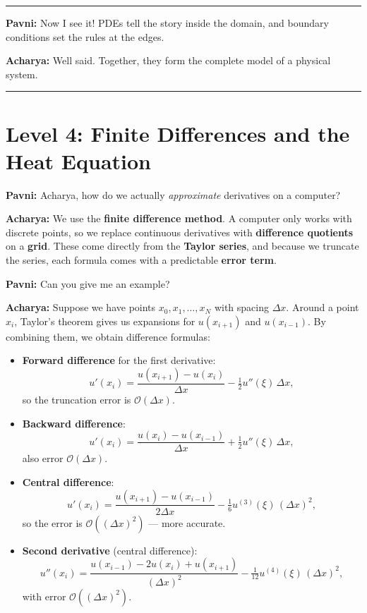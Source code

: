\documentclass[
  letterpaper,
]{book}
\begin{document}
\begin{center}\rule{0.5\linewidth}{0.5pt}\end{center}

\textbf{Pavni:} Now I see it! PDEs tell the story inside the domain, and
boundary conditions set the rules at the edges.

\textbf{Acharya:} Well said. Together, they form the complete model of a
physical system.

\begin{center}\rule{0.5\linewidth}{0.5pt}\end{center}


\chapter{Level 4: Finite Differences and the Heat
Equation}\label{level-4-finite-differences-and-the-heat-equation}

\textbf{Pavni:} Acharya, how do we actually \emph{approximate}
derivatives on a computer?

\textbf{Acharya:} We use the \textbf{finite difference method}. A
computer only works with discrete points, so we replace continuous
derivatives with \textbf{difference quotients} on a \textbf{grid}. These
come directly from the \textbf{Taylor series}, and because we truncate
the series, each formula comes with a predictable \textbf{error term}.

\textbf{Pavni:} Can you give me an example?

\textbf{Acharya:} Suppose we have points \(x_0, x_1, \dots, x_N\) with
spacing \(\Delta x\). Around a point \(x_i\), Taylor's theorem gives us
expansions for \(u(x_{i+1})\) and \(u(x_{i-1})\). By combining them, we
obtain difference formulas:

\begin{itemize}
\item
  \textbf{Forward difference} for the first derivative: \[
  u'(x_i) = \frac{u(x_{i+1}) - u(x_i)}{\Delta x} - \tfrac{1}{2}u''(\xi)\,\Delta x,
  \] so the truncation error is \(\mathcal{O}(\Delta x)\).
\item
  \textbf{Backward difference}: \[
  u'(x_i) = \frac{u(x_i) - u(x_{i-1})}{\Delta x} + \tfrac{1}{2}u''(\xi)\,\Delta x,
  \] also error \(\mathcal{O}(\Delta x)\).
\item
  \textbf{Central difference}: \[
  u'(x_i) = \frac{u(x_{i+1}) - u(x_{i-1})}{2\Delta x} - \tfrac{1}{6}u^{(3)}(\xi)\,(\Delta x)^2,
  \] so the error is \(\mathcal{O}((\Delta x)^2)\) --- more accurate.
\item
  \textbf{Second derivative} (central difference): \[
  u''(x_i) = \frac{u(x_{i-1}) - 2u(x_i) + u(x_{i+1})}{(\Delta x)^2} - \tfrac{1}{12}u^{(4)}(\xi)\,(\Delta x)^2,
  \] with error \(\mathcal{O}((\Delta x)^2)\).
\end{itemize}
\end{document}
